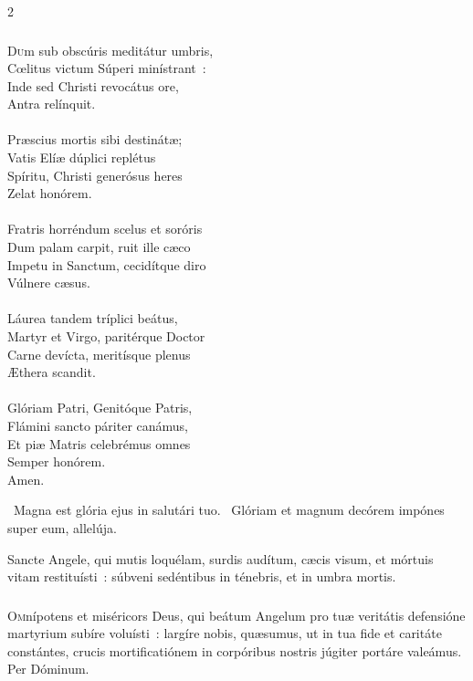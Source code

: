 \documentclass[9pt,twoside]{extarticle}
\begin{document}
\begin{multicols}{2}
\subsubsection*{\center {}}
\lettrine{D}um sub obscúris meditátur umbris,\\
Cœlitus victum Súperi minístrant~:\\
Inde sed Christi revocátus ore,\\
Antra relínquit.\\
\\
Præscius mortis sibi destinátæ;\\
Vatis Elíæ dúplici replétus\\
Spíritu, Christi generósus heres\\
Zelat honórem.\\
\\
Fratris horréndum scelus et soróris\\
Dum palam carpit, ruit ille cæco\\
Impetu in Sanctum, cecidítque diro\\
Vúlnere cæsus.\\
\\
Láurea tandem tríplici beátus,\\
Martyr et Virgo, paritérque Doctor\\
Carne devícta, meritísque plenus\\
Æthera scandit.\\
\\
Glóriam Patri, Genitóque Patris,\\
Flámini sancto páriter canámus,\\
Et piæ Matris celebrémus omnes\\
Semper honórem.\\
Amen.

\begin{tightlist}{}
\item {}~Magna est glória ejus in salutári tuo. ~Glóriam et magnum decórem impónes super eum, allelúja.
\item {} Sancte Angele, qui mutis loquélam, surdis audítum, cæcis visum, et mórtuis vitam restituísti~: súbveni sedéntibus in ténebris, et in umbra mortis.
\end{tightlist}

\subsubsection*{\center {}}
\lettrine{O}mnípotens et miséricors Deus, qui beátum Angelum pro tuæ veritátis defensióne martyrium subíre voluísti~: largíre nobis, quæsumus, ut in tua fide et caritáte constántes, crucis mortificatiónem in corpóribus nostris júgiter portáre valeámus. Per Dóminum.


\end{multicols}
\end{document}
